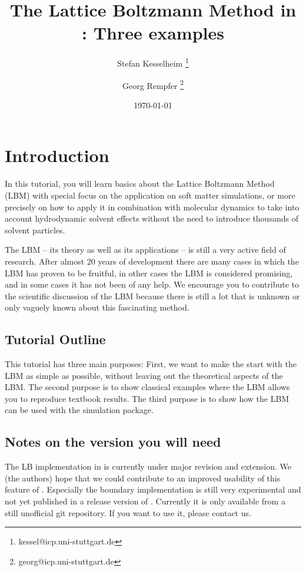 \renewcommand{\d}{\mathrm d}
\subject{ESPResSo Tutorial}
\title{The Lattice Boltzmann Method in \ES{}: Three examples } \author{ Stefan Kesselheim \thanks{\ttfamily 
kessel@icp.uni-stuttgart.de}  \and  Georg Rempfer \thanks{\ttfamily 
georg@icp.uni-stuttgart.de}}
\date{\today}
\publishers{Institute for Computational Physics, Stuttgart University}

\maketitle \tableofcontents


\chapter{Introduction}
In this tutorial, you will learn basics about the 
Lattice Boltzmann Method (LBM) with special focus on the application
on soft matter simulations, or more precisely on how to apply it 
in combination with molecular dynamics to take into account 
hydrodynamic solvent effects without the need to introduce
thousands of solvent particles. 

The LBM -- its theory as well as its applications -- is 
still a very active field of research. After almost 20 years
of development there are many cases in which the LBM has proven
to be fruitful, in other cases the LBM is considered promising,
and in some cases it has not been of any help. We
encourage you to contribute to the scientific discussion 
of the LBM because there is still a lot 
that is unknown or only vaguely known about this fascinating
method. 

\section*{Tutorial Outline}
This tutorial has three main purposes: First, we want to make the start
with the LBM as simple as possible, without leaving out the theoretical
aspects of the LBM.
The second purpose is to show classical examples where the LBM allows 
you to reproduce textbook results.
The third purpose is to show how the LBM can be used with the
\ES{} simulation package. 

\section*{Notes on the \ES{} version you will need}
The LB implementation in \ES{} is currently under major revision
and extension. We (the authors) hope that we could contribute
to an improved usability of this feature of \ES{}. Especially 
the boundary implementation is still very experimental and
not yet published in a release version of \ES{}. Currently 
it is only available from a still unofficial git repository. 
If you want to use it, please contact us.
